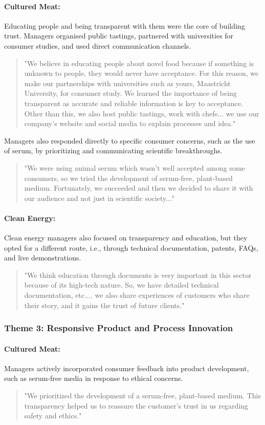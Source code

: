 \paragraph{Cultured Meat:} Educating people and being transparent with them were the core of building trust. Managers organised public tastings, partnered with universities for consumer studies, and used direct communication channels.
\begin{quote}
	"We believe in educating people about novel food because if something is unknown to people, they would never have acceptance. For this reason, we make our partnerships with universities such as yours, Maastricht University, for consumer study. We learned the importance of being transparent as accurate and reliable information is key to acceptance. Other than this, we also host public tastings, work with chefs... we use our company's website and social media to explain processes and idea."
\end{quote}
Managers also responded directly to specific consumer concerns, such as the use of serum, by prioritizing and communicating scientific breakthroughs.
\begin{quote}
	"We were using animal serum which wasn't well accepted among some consumers, so we tried the development of serum-free, plant-based medium. Fortunately, we succeeded and then we decided to share it with our audience and not just in scientific society..."
\end{quote}

\paragraph{Clean Energy:} Clean energy managers also focused on transparency and education, but they opted for a different route, i.e., through technical documentation, patents, FAQs, and live demonstrations.
\begin{quote}
	"We think education through documents is very important in this sector because of its high-tech nature. So, we have detailed technical documentation, etc.... we also share experiences of customers who share their story, and it gains the trust of future clients."
\end{quote}

\subsubsection{Theme 3: Responsive Product and Process Innovation}
\paragraph{Cultured Meat:} Managers actively incorporated consumer feedback into product development, such as serum-free media in response to ethical concerns.
\begin{quote}
	"We prioritized the development of a serum-free, plant-based medium. This transparency helped us to reassure the customer's trust in us regarding safety and ethics."
\end{quote}

